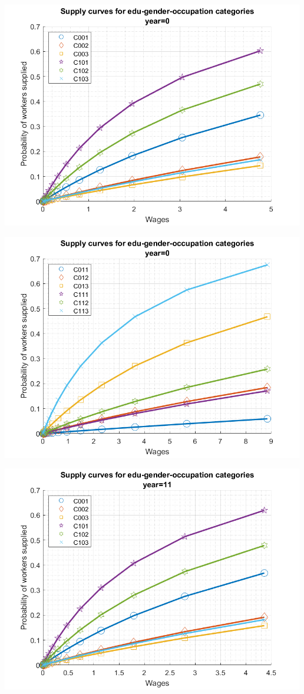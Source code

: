 \documentclass[
]{book}
\begin{document}
\includegraphics[width=5.20833in,height=\textheight]{img/bfwx_mlogit_images/figure_2.png}

\includegraphics[width=5.20833in,height=\textheight]{img/bfwx_mlogit_images/figure_3.png}

\includegraphics[width=5.20833in,height=\textheight]{img/bfwx_mlogit_images/figure_4.png}
\end{document}
